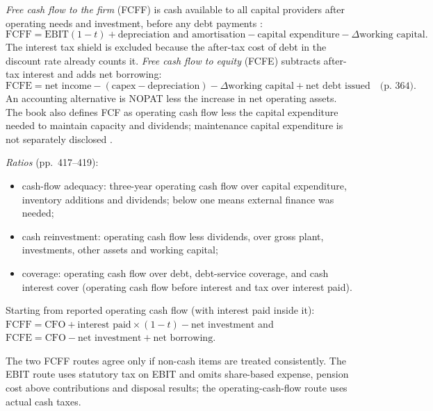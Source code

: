 \begin{qfmethod}\label{meth:free-cash-flow-coverage}
 \emph{Free cash flow to the firm} (FCFF) is cash available to all capital providers after operating needs and investment, before any debt payments \citep[pp.~380--381]{investment-valuation-2012}:
\[ \mathrm{FCFF}=\mathrm{EBIT}(1-t)+\text{depreciation and amortisation}-\text{capital expenditure}-\Delta\text{working capital}. \]
The interest tax shield is excluded because the after-tax cost of debt in the discount rate already counts it. \emph{Free cash flow to equity} (FCFE) subtracts after-tax interest and adds net borrowing:
\[ \mathrm{FCFE}=\text{net income}-(\text{capex}-\text{depreciation})-\Delta\text{working capital}+\text{net debt issued} \quad\text{(p.~364)}. \]
An accounting alternative is NOPAT less the increase in net operating assets. The book also defines FCF as operating cash flow less the capital expenditure needed to maintain capacity and dividends; maintenance capital expenditure is not separately disclosed \citep[p.~417]{financial-statement-analysis-2009}.

\emph{Ratios} (pp.~417--419):
\begin{itemize}
\item cash-flow adequacy: three-year operating cash flow over capital expenditure, inventory additions and dividends; below one means external finance was needed;
\item cash reinvestment: operating cash flow less dividends, over gross plant, investments, other assets and working capital;
\item coverage: operating cash flow over debt, debt-service coverage, and cash interest cover (operating cash flow before interest and tax over interest paid).
\end{itemize}

 Starting from reported operating cash flow (with interest paid inside it): $\mathrm{FCFF}=\mathrm{CFO}+\text{interest paid}\times(1-t)-\text{net investment}$ and $\mathrm{FCFE}=\mathrm{CFO}-\text{net investment}+\text{net borrowing}$.

 The two FCFF routes agree only if non-cash items are treated consistently. The EBIT route uses statutory tax on EBIT and omits share-based expense, pension cost above contributions and disposal results; the operating-cash-flow route uses actual cash taxes.


\end{qfmethod}
